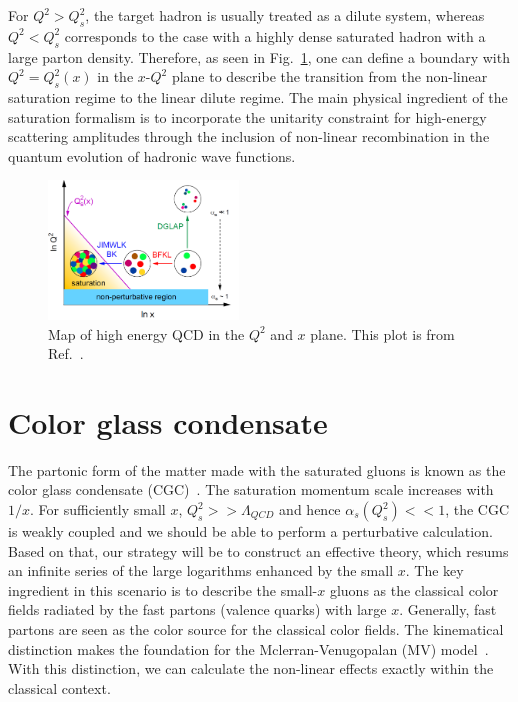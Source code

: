 For $Q^{2}>Q_{s}^{2}$, the target hadron is usually treated as a dilute system,
whereas $Q^{2}<Q_{s}^{2}$ corresponds to the case with a highly dense saturated
hadron with a large parton density. Therefore, as seen in
Fig.~\ref{fig:Q2vX_map}, one can define a boundary with $Q^2=Q_s^2(x)$ in the
$x\textrm{-}Q^2$ plane to describe the transition from the non-linear saturation
regime to the linear dilute regime. The main physical ingredient of the
saturation formalism is to incorporate the unitarity constraint for high-energy
scattering amplitudes through the inclusion of non-linear recombination in the
quantum evolution of hadronic wave functions.
\begin{figure}
\centering
\includegraphics[width=0.45\textwidth]{plots/chpt3/Q2Vx_map.png}
\caption[$Q^{2}$ vs $x$ map]{
Map of high energy QCD in the $Q^{2}$ and $x$ plane. This plot is from Ref.~\cite{Accardi:2012qut}.}
\label{fig:Q2vX_map}
\end{figure}


\section{Color glass condensate}\label{sec:CGC}
The partonic form of the matter made with the saturated gluons is known as the
color glass condensate (CGC)~\cite{Iancu:2002xk}. The saturation momentum scale
increases with $1/x$. For sufficiently small $x$, $Q^{2}_{s}>>\Lambda_{QCD}$ and
hence $\alpha_{s}(Q^{2}_{s})<<1$, the CGC is weakly coupled and we should be
able to perform a perturbative calculation. Based on that, our strategy will be
to construct an effective theory, which resums an infinite series of the large
logarithms enhanced by the small $x$. The key ingredient in this scenario is to
describe the small-$x$ gluons as the classical color fields radiated by the fast
partons (valence quarks) with large $x$. Generally, fast partons are seen as the
color source for the classical color fields. The kinematical distinction makes
the foundation for the Mclerran-Venugopalan (MV) model~\cite{McLerran:1993ni}.
With this distinction, we can calculate the non-linear effects exactly within
the classical context.

